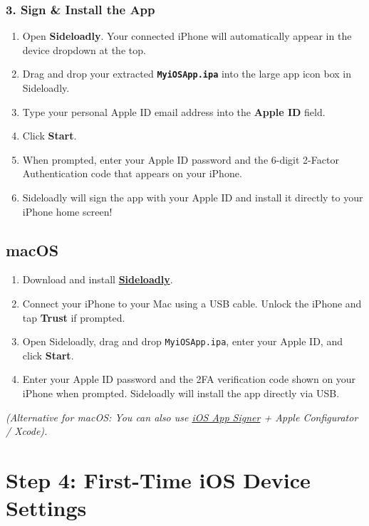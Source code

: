 \documentclass[11pt,a4paper]{article}
\begin{document}
\subsubsection*{3. Sign \& Install the App}
\begin{enumerate}
    \item Open \textbf{Sideloadly}. Your connected iPhone will automatically appear in the device dropdown at the top.
    \item Drag and drop your extracted \textbf{\texttt{MyiOSApp.ipa}} into the large app icon box in Sideloadly.
    \item Type your personal Apple ID email address into the \textbf{Apple ID} field.
    \item Click \textbf{Start}.
    \item When prompted, enter your Apple ID password and the 6-digit 2-Factor Authentication code that appears on your iPhone.
    \item Sideloadly will sign the app with your Apple ID and install it directly to your iPhone home screen!
\end{enumerate}

{}
\subsection*{\faApple\enskip macOS}

\begin{enumerate}
    \item Download and install \href{https://sideloadly.io/}{\textbf{Sideloadly}}.
    \item Connect your iPhone to your Mac using a USB cable. Unlock the iPhone and tap \textbf{Trust} if prompted.
    \item Open Sideloadly, drag and drop \texttt{MyiOSApp.ipa}, enter your Apple ID, and click \textbf{Start}.
    \item Enter your Apple ID password and the 2FA verification code shown on your iPhone when prompted. Sideloadly will install the app directly via USB.
\end{enumerate}
\textit{(Alternative for macOS: You can also use \href{https://dantheman827.github.io/ios-app-signer/}{iOS App Signer} + Apple Configurator / Xcode).}

{}
\section*{Step 4: First-Time iOS Device Settings}
\end{document}
